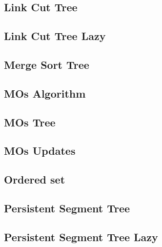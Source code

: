 \subsection{Link Cut Tree}
\raggedbottom
\hrulefill
\subsection{Link Cut Tree Lazy}
\raggedbottom
\hrulefill
\subsection{Merge Sort Tree}
\raggedbottom
\hrulefill
\subsection{MOs Algorithm}
\raggedbottom
\hrulefill
\subsection{MOs Tree}
\raggedbottom
\hrulefill
\subsection{MOs Updates}
\raggedbottom
\hrulefill
\subsection{Ordered set}
\raggedbottom
\hrulefill
\subsection{Persistent Segment Tree}
\raggedbottom
\hrulefill
\subsection{Persistent Segment Tree Lazy}
\raggedbottom
\hrulefill
